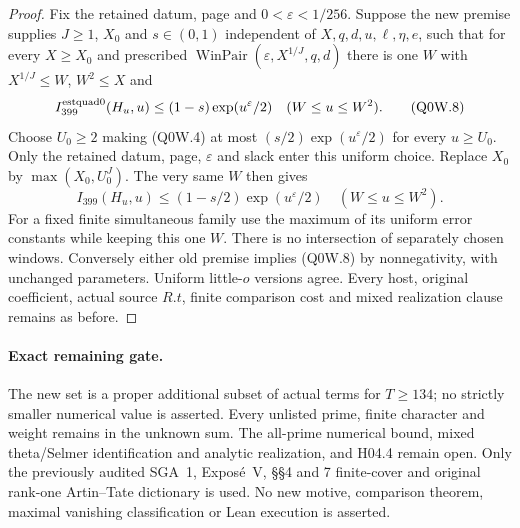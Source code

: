 \begin{proof}
Fix the retained datum, page and $0<\varepsilon<1/256$.
Suppose the new premise supplies $J\geq1$, $X_0$ and
$s\in(0,1)$ independent of $X,q,d,u,\ell,\eta,e$, such that
for every $X\geq X_0$ and prescribed
$\operatorname{WinPair}(\varepsilon,X^{1/J},q,d)$ there is
one $W$ with $X^{1/J}\leq W$, $W^2\leq X$ and
\[
 I_{399}^{\rm estquad0}(H_u,u)\leq(1-s)\exp(u^\varepsilon/2)
                                      \quad(W\leq u\leq W^2).
 \tag{Q0W.8}
\]
Choose $U_0\geq2$ making (Q0W.4) at most
$(s/2)\exp(u^\varepsilon/2)$ for every $u\geq U_0$.
Only the retained datum, page, $\varepsilon$ and slack enter
this uniform choice.  Replace $X_0$ by $\max(X_0,U_0^J)$.
The very same $W$ then gives
\[
 I_{399}(H_u,u)\leq(1-s/2)\exp(u^\varepsilon/2)
                                      \quad(W\leq u\leq W^2).
 \tag{Q0W.9}
\]
For a fixed finite simultaneous family use the maximum of its
uniform error constants while keeping this one $W$.
There is no intersection of separately chosen windows.
Conversely either old premise implies (Q0W.8) by nonnegativity,
with unchanged parameters.  Uniform little-$o$ versions agree.
Every host, original coefficient, actual source $R.t$, finite
comparison cost and mixed realization clause remains as before.
\end{proof}

\paragraph{Exact remaining gate.}
The new set is a proper additional subset of actual terms for
$T\geq134$; no strictly smaller numerical value is asserted.
Every unlisted prime, finite character and weight remains in the
unknown sum.  The all-prime numerical bound, mixed theta/Selmer
identification and analytic realization, and H04.4 remain open.
Only the previously audited SGA~1, Expos\'e~V, \S\S4 and 7
finite-cover and original rank-one Artin--Tate dictionary is used.
No new motive, comparison theorem, maximal vanishing classification
or Lean execution is asserted.
